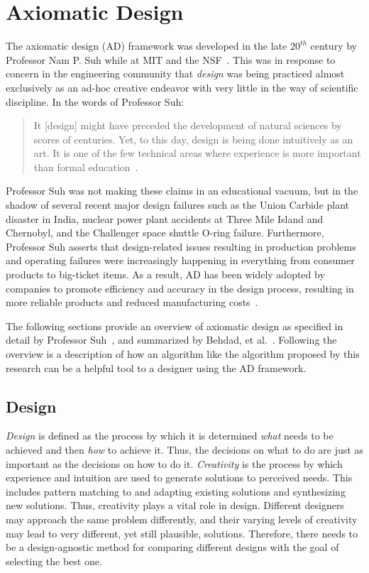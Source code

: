\section{Axiomatic Design}\label{sec:axiomatic}

The axiomatic design (AD) framework was developed in the late \(20^{th}\) century by Professor Nam P. Suh while at
MIT and the NSF~\cite{suh}.  This was in response to concern in the engineering community that \emph{design} was
being practiced almost exclusively as an ad-hoc creative endeavor with very little in the way of scientific
discipline.  In the words of Professor Suh:
\begin{quote}
  \vspace{-\baselineskip}
  It [design] might have preceded the development of natural sciences by scores of centuries.  Yet, to this day,
  design is being done intuitively as an art.  It is one of the few technical areas where experience is more
  important than formal education~\cite{suh}.
\end{quote}
Professor Suh was not making these claims in an educational vacuum, but in the shadow of several recent major
design failures such as the Union Carbide plant disaster in India, nuclear power plant accidents at Three Mile
Island and Chernobyl, and the Challenger space shuttle O-ring failure.  Furthermore, Professor Suh asserts that
design-related issues resulting in production problems and operating failures were increasingly happening in
everything from consumer products to big-ticket items.  As a result, AD has been widely adopted by companies to
promote efficiency and accuracy in the design process, resulting in more reliable products and reduced
manufacturing costs~\cite{shirwaiker}.

The following sections provide an overview of axiomatic design as specified in detail by Professor
Suh~\cite{suh,suh2}, and summarized by Behdad, et al.~\cite{cavallaro,jahanbekam}.  Following the overview is a
description of how an algorithm like the algorithm proposed by this research can be a helpful tool to a designer
using the AD framework.

\subsection{Design}\label{sec:sub:design}

\emph{Design} is defined as the process by which it is determined \emph{what} needs to be achieved and then
\emph{how} to achieve it.  Thus, the decisions on what to do are just as important as the decisions on how to do
it.  \emph{Creativity} is the process by which experience and intuition are used to generate solutions to perceived
needs.  This includes pattern matching to and adapting existing solutions and synthesizing new solutions.  Thus,
creativity plays a vital role in design.  Different designers may approach the same problem differently, and their
varying levels of creativity may lead to very different, yet still plausible, solutions.  Therefore, there needs to
be a design-agnostic method for comparing different designs with the goal of selecting the best one.

